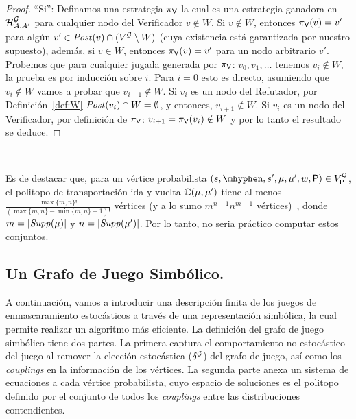 \begin{proof}
``Si'':  Definamos una estrategia $\pi_{\mathsf{V}}$ la cual es una estrategia ganadora en $\mathcal{H}^{\mathcal{G}}_{A,A'}$ para cualquier nodo del Verificador $v \notin W$. 
Si $v \notin W$, entonces $\pi_{\mathsf{V}}(v) = v'$ para algún $v' \in \mathit{Post}(v) \cap (V^{\mathcal{G}} \setminus W)$ (cuya existencia está garantizada por nuestro supuesto), 
además, si $v \in W$, entonces $\pi_{\mathsf{V}}(v) = v'$ para un nodo arbitrario $v'$. 
Probemos que para cualquier jugada generada por $\pi_{\mathsf{V}}$: $v_0, v_1, \dots$ tenemos $v_i \notin W$, la prueba es por inducción sobre $i$.
Para $i=0$ esto es directo, asumiendo que $v_i \notin W$ vamos a probar que $v_{i+1} \notin W$. 
Si $v_i$ es un nodo del Refutador, por Definición~\ref{def:W}  
$\mathit{Post}(v_i) \cap W = \emptyset$, y entonces, $v_{i+1} \notin W$. 
Si $v_i$ es un nodo del Verificador, por definición de $\pi_{\mathsf{V}}$: $v_{i+1} = \pi_{\mathsf{V}}(v_i) \notin W$ y por lo tanto el resultado se deduce.  
\end{proof} \\
\fi


%
Es de destacar que, para un vértice probabilista
$(s, \mhyphen, s', \mu, \mu', w, \Probabilistic) \in V^\StochG_\Probabilistic$,
el politopo de transportación ida y vuelta $\mathbb{C}(\mu,\mu')$ tiene al menos $\frac{\max\{m,n\}!}{(\max\{m, n\}-\min\{m,n\}+1)!}$ vértices
(y a lo sumo $m^{n-1}n^{m-1}$ vértices)~\cite{KleeWitzgall}, donde
$m=|\mathit{Supp}(\mu)|$ y $n=|\mathit{Supp}(\mu')|$.  Por lo tanto, no seria práctico computar estos conjuntos.





\subsection{Un Grafo de Juego Simbólico.}


A continuación, vamos a introducir una descripción finita de los juegos de enmascaramiento estocásticos a través de una representación simbólica, la cual permite realizar un algoritmo más eficiente.
%
La definición del grafo de juego simbólico tiene dos partes.  La primera captura el comportamiento no estocástico del juego al remover la elección estocástica ($\delta^{\mathcal{G}}$) del grafo de juego, así como los \emph{couplings} en la información de los vértices. La segunda parte anexa un sistema de ecuaciones a cada vértice probabilista, cuyo espacio de soluciones es el politopo definido por el conjunto de todos los \emph{couplings} entre las distribuciones contendientes.


